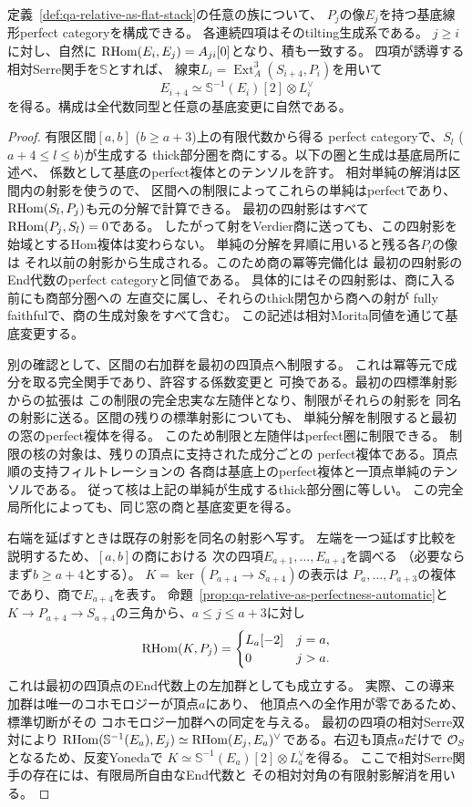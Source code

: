 \begin{theorem}[相対AS族の四頂点Morita窓]
\label{thm:qa-relative-as-four-window}
定義~\ref{def:qa-relative-as-flat-stack}の任意の族について、
$P_j$の像$E_j$を持つ基底線形perfect categoryを構成できる。
各連続四項はそのtilting生成系である。
$j\ge i$に対し、自然に
$\operatorname{RHom}(E_i,E_j)=A_{ji}[0]$となり、積も一致する。
四項が誘導する相対Serre関手を$\mathbb S$とすれば、
線束$L_i=\operatorname{Ext}^3_A(S_{i+4},P_i)$を用いて
\[
 E_{i+4}\simeq \mathbb S^{-1}(E_i)[2]\otimes L_i^\vee
\]
を得る。構成は全代数同型と任意の基底変更に自然である。
\end{theorem}
\begin{proof}
有限区間$[a,b]$ ($b\ge a+3$)上の有限代数から得る
perfect categoryで、$S_l$ ($a+4\le l\le b$)が生成する
thick部分圏を商にする。以下の圏と生成は基底局所に述べ、
係数として基底のperfect複体とのテンソルを許す。
相対単純の解消は区間内の射影を使うので、
区間への制限によってこれらの単純はperfectであり、
$\operatorname{RHom}(S_l,P_j)$も元の分解で計算できる。
最初の四射影はすべて$\operatorname{RHom}(P_j,S_l)=0$である。
したがって射をVerdier商に送っても、この四射影を
始域とするHom複体は変わらない。
単純の分解を昇順に用いると残る各$P_l$の像は
それ以前の射影から生成される。このため商の冪等完備化は
最初の四射影のEnd代数のperfect categoryと同値である。
具体的にはその四射影は、商に入る前にも商部分圏への
左直交に属し、それらのthick閉包から商への射が
fully faithfulで、商の生成対象をすべて含む。
この記述は相対Morita同値を通じて基底変更する。

別の確認として、区間の右加群を最初の四頂点へ制限する。
これは冪等元で成分を取る完全関手であり、許容する係数変更と
可換である。最初の四標準射影からの拡張は
この制限の完全忠実な左随伴となり、制限がそれらの射影を
同名の射影に送る。区間の残りの標準射影についても、
単純分解を制限すると最初の窓のperfect複体を得る。
このため制限と左随伴はperfect圏に制限できる。
制限の核の対象は、残りの頂点に支持された成分ごとの
perfect複体である。頂点順の支持フィルトレーションの
各商は基底上のperfect複体と一頂点単純のテンソルである。
従って核は上記の単純が生成するthick部分圏に等しい。
この完全局所化によっても、同じ窓の商と基底変更を得る。

右端を延ばすときは既存の射影を同名の射影へ写す。
左端を一つ延ばす比較を説明するため、$[a,b]$の商における
次の四項$E_{a+1},\ldots,E_{a+4}$を調べる
（必要ならまず$b\ge a+4$とする）。
$K=\ker(P_{a+4}\to S_{a+4})$の表示は
$P_a,\ldots,P_{a+3}$の複体であり、商で$E_{a+4}$を表す。
命題~\ref{prop:qa-relative-as-perfectness-automatic}と
$K\to P_{a+4}\to S_{a+4}$の三角から、$a\le j\le a+3$に対し
\[
 \operatorname{RHom}(K,P_j)=
 \begin{cases}
 L_a[-2]& j=a,\\
 0& j>a .
 \end{cases}
\]
これは最初の四頂点のEnd代数上の左加群としても成立する。
実際、この導来加群は唯一のコホモロジーが頂点$a$にあり、
他頂点への全作用が零であるため、標準切断がその
コホモロジー加群への同定を与える。
最初の四項の相対Serre双対により
$\operatorname{RHom}(\mathbb S^{-1}(E_a),E_j)\simeq
\operatorname{RHom}(E_j,E_a)^\vee$である。右辺も頂点$a$だけで
$\mathcal O_S$となるため、反変Yonedaで
$K\simeq \mathbb S^{-1}(E_a)[2]\otimes L_a^\vee$を得る。
ここで相対Serre関手の存在には、有限局所自由なEnd代数と
その相対対角の有限射影解消を用いる。


\end{proof}
